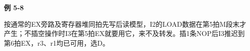 {\color{ink}\bfseries 例 5-8}\par\vspace{1bp}按通常的EX旁路及寄存器堆同拍先写后读模型，I2的LOAD数据在第5拍M段末才产生；不插空操作时I3在第5拍EX就要用它，来不及转发。插1条NOP后I3推迟到第6拍EX，r3、r1均已可用，选D。
